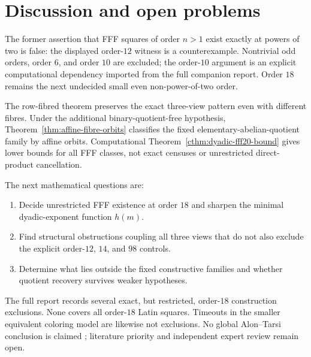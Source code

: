 \section{Discussion and open problems}

The former assertion that FFF squares of order $n>1$ exist exactly
at powers of two is false: the displayed order-$12$ witness is a
counterexample. Nontrivial odd orders, order $6$, and order $10$
are excluded; the order-$10$ argument is an explicit computational
dependency imported from the full companion report. Order $18$
remains the next undecided small even non-power-of-two order.

The row-fibred theorem preserves the exact three-view pattern even
with different fibres. Under the additional binary-quotient-free
hypothesis, Theorem~\ref{thm:affine-fibre-orbits} classifies the
fixed elementary-abelian-quotient family by affine orbits.
Computational Theorem~\ref{cthm:dyadic-fff20-bound} gives lower
bounds for all FFF classes, not exact censuses or unrestricted
direct-product cancellation.

The next mathematical questions are:
\begin{enumerate}
\item Decide unrestricted FFF existence at order $18$ and sharpen
the minimal dyadic-exponent function $h(m)$.
\item Find structural obstructions coupling all three views that
do not also exclude the explicit order-$12$, $14$, and $98$ controls.
\item Determine what lies outside the fixed constructive families
and whether quotient recovery survives weaker hypotheses.
\end{enumerate}

The full report records several exact, but restricted, order-$18$
construction exclusions. None covers all order-$18$ Latin squares.
Timeouts in the smaller equivalent coloring model are likewise
not exclusions. No global Alon--Tarsi conclusion is claimed
\cite{AlonTarsi1992}; literature priority and independent expert
review remain open.
